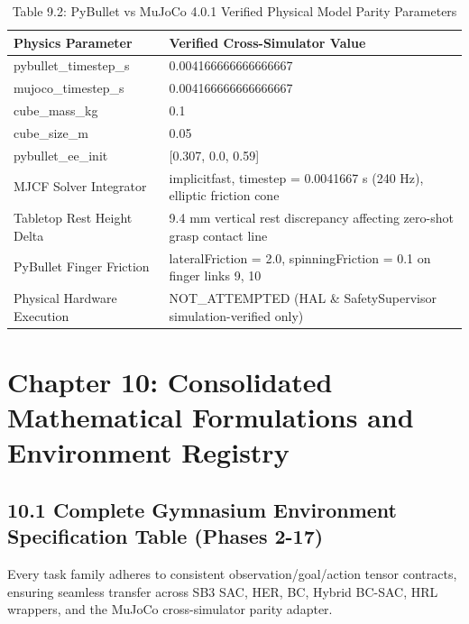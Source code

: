 \documentclass[11pt,a4paper,oneside]{book}
\begin{document}
\begin{longtable}{l l}\caption{Table 9.2: PyBullet vs MuJoCo 4.0.1 Verified Physical Model Parity Parameters}\\\toprule
Physics Parameter & Verified Cross-Simulator Value \\ \midrule \endhead
pybullet\_timestep\_s & 0.004166666666666667 \\
mujoco\_timestep\_s & 0.004166666666666667 \\
cube\_mass\_kg & 0.1 \\
cube\_size\_m & 0.05 \\
pybullet\_ee\_init & [0.307, 0.0, 0.59] \\
MJCF Solver Integrator & implicitfast, timestep = 0.0041667 s (240 Hz), elliptic friction cone \\
Tabletop Rest Height Delta & 9.4 mm vertical rest discrepancy affecting zero-shot grasp contact line \\
PyBullet Finger Friction & lateralFriction = 2.0, spinningFriction = 0.1 on finger links 9, 10 \\
Physical Hardware Execution & NOT\_ATTEMPTED (HAL \& SafetySupervisor simulation-verified only) \\
\bottomrule \end{longtable}
\chapter{Chapter 10: Consolidated Mathematical Formulations and Environment Registry}
\section{10.1 Complete Gymnasium Environment Specification Table (Phases 2-17)}
Every task family adheres to consistent observation/goal/action tensor contracts, ensuring seamless transfer across SB3 SAC, HER, BC, Hybrid BC-SAC, HRL wrappers, and the MuJoCo cross-simulator parity adapter.
\end{document}
